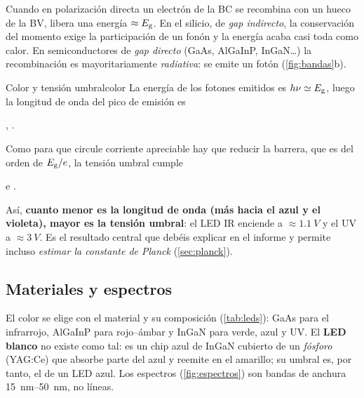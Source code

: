\documentclass[11pt,a4paper]{article}
\begin{document}
Cuando en polarización directa un electrón de la BC se recombina con un hueco
de la BV, libera una energía $\approx E_{\mathrm g}$. En el silicio, de \emph{gap
indirecto}, la conservación del momento exige la participación de un fonón y
la energía acaba casi toda como calor. En semiconductores de \emph{gap
directo} (GaAs, AlGaInP, InGaN\ldots) la recombinación es mayoritariamente
\emph{radiativa}: se emite un fotón (\cref{fig:bandas}b).

\begin{proposicion}{Color y tensión umbral}{color}
  La energía de los fotones emitidos es $h\nu\simeq E_{\mathrm g}$, luego la longitud de
  onda del pico de emisión es
  \begin{destacada}
    \lambda\simeq{},\qquad
    \lambda[\si{nm}]\simeq{}.
    \label{eq:lambda}
  \end{destacada}
  Como para que circule corriente apreciable hay que reducir la barrera, que es
  del orden de $E_{\mathrm g}/e$, la tensión umbral cumple
  \begin{destacada}
    e\Vg\simeq\Eg\simeq{}
    \quad\Longrightarrow\quad
    \Vg[\si{V}]\simeq{}.
    \label{eq:umbral-lambda}
  \end{destacada}
\end{proposicion}

Así, \textbf{cuanto menor es la longitud de onda (más hacia el azul y el
violeta), mayor es la tensión umbral}: el LED IR enciende a $\approx\SI{1.1}{V}$
y el UV a $\approx\SI{3}{V}$. Es el resultado central que debéis explicar en
el informe y permite incluso \emph{estimar la constante de Planck}
(\cref{sec:planck}).

\subsection{Materiales y espectros}

El color se elige con el material y su composición (\cref{tab:leds}): GaAs
para el infrarrojo, AlGaInP para rojo--ámbar y InGaN para verde, azul y UV.
El \textbf{LED blanco} no existe como tal: es un chip azul de InGaN cubierto
de un \emph{fósforo} (YAG:Ce) que absorbe parte del azul y reemite en el
amarillo; su umbral es, por tanto, el de un LED azul. Los espectros
(\cref{fig:espectros}) son bandas de anchura \SIrange{15}{50}{nm}, no
líneas.
\end{document}
